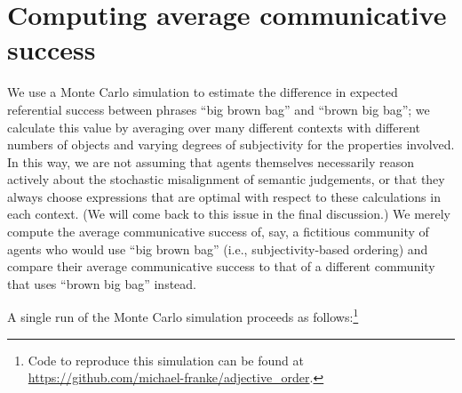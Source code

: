 \documentclass[10pt,a4paper]{article}
\begin{document}
\section{Computing average communicative success}

We use a Monte Carlo simulation to estimate the difference in expected referential success between phrases ``big brown bag'' and ``brown big bag''; we calculate this value by averaging over many different contexts with different numbers of objects and varying degrees of subjectivity for the properties involved. In this way, we are not assuming that agents themselves necessarily reason actively about the stochastic misalignment of semantic judgements, or that they always choose expressions that are optimal with respect to these calculations in each context. (We will come back to this issue in the final discussion.) We merely compute the average communicative success of, say, a fictitious community of agents who would use ``big brown bag'' (i.e., subjectivity-based ordering) and compare their average communicative success to that of a different community that uses ``brown big bag'' instead.

A single run of the Monte Carlo simulation proceeds as follows:\footnote{Code to reproduce this simulation can be found at \url{https://github.com/michael-franke/adjective_order}.}
\end{document}
